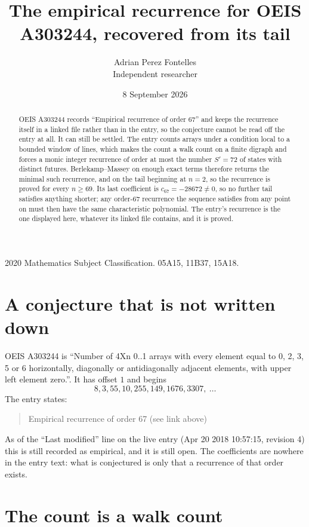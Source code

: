 \documentclass[11pt,a4paper]{article}
\title{The empirical recurrence for OEIS A303244, recovered from its tail}
\author{Adrian Perez Fontelles\\ \small Independent researcher}
\date{8 September 2026}
\theoremstyle{plain}
\theoremstyle{definition}
\begin{document}
\maketitle

\begin{abstract}
OEIS A303244 records ``Empirical recurrence of order $67$'' and keeps the recurrence itself in
a linked file rather than in the entry, so the conjecture cannot be read off the entry at all.
It can still be settled. The entry counts arrays under a condition local to a bounded window of
lines, which makes the count a walk count on a finite digraph and forces a monic integer
recurrence of order at most the number $S'=72$ of states with distinct futures. Berlekamp--Massey on
enough exact terms therefore returns the minimal such recurrence, and on the tail beginning at $n=2$, so the recurrence is proved for every $n\ge69$.
Its last coefficient is $c_{67}=-28672\neq0$, so no further tail satisfies anything
shorter; any order-$67$ recurrence the sequence satisfies from any point on must then have
the same characteristic polynomial. The entry's recurrence is the one displayed here, whatever
its linked file contains, and it is proved.
\end{abstract}

\noindent\small 2020 Mathematics Subject Classification. 05A15, 11B37, 15A18.\normalsize

\section{A conjecture that is not written down}

OEIS A303244 is ``Number of 4Xn 0..1 arrays with every element equal to 0, 2, 3, 5 or 6 horizontally, diagonally or antidiagonally adjacent elements, with upper left element zero.''. It has offset $1$ and begins
\[
8, 3, 55, 10, 255, 149, 1676, 3307,\ \dots
\]
The entry states:
\begin{quote}
Empirical recurrence of order 67 (see link above)
\end{quote}
As of the ``Last modified'' line on the live entry (Apr 20 2018 10:57:15, revision 4)
this is still recorded as empirical, and it is still open. The coefficients are nowhere in the
entry text: what is conjectured is only that a recurrence of that order exists.

\section{The count is a walk count}
\end{document}
